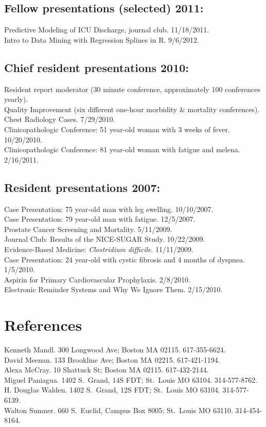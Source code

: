 \documentclass[12pt]{article}
\begin{document}
\subsection*{Fellow presentations (selected) 2011:}
Predictive Modeling of ICU Discharge, journal club. 11/18/2011.\\
Intro to Data Mining with Regression Splines in R. 9/6/2012.

\subsection*{Chief resident presentations 2010:}
Resident report moderator (30 minute conference, approximately 100
conferences yearly).\\
Quality Improvement (six different one-hour morbidity \& mortality
conferences).\\
Chest Radiology Cases. 7/29/2010.\\
Clinicopathologic Conference: 51 year-old woman with 3 weeks of fever.
10/20/2010.\\
Clinicopathologic Conference: 81 year-old woman with fatigue and
melena. 2/16/2011.

\subsection*{Resident presentations 2007:}
Case Presentation: 75 year-old man with leg swelling. 10/10/2007.\\
Case Presentation: 79 year-old man with fatigue. 12/5/2007.\\
Prostate Cancer Screening and Mortality. 5/11/2009.\\
Journal Club: Results of the NICE-SUGAR Study. 10/22/2009.\\
Evidence-Based Medicine: \emph{Clostridium difficile}. 11/11/2009.\\
Case Presentation: 24 year-old with cystic fibrosis and 4 months of
dyspnea. 1/5/2010.\\
Aspirin for Primary Cardiovascular Prophylaxis. 2/8/2010.\\
Electronic Reminder Systems and Why We Ignore Them. 2/15/2010.

\section*{References}
Kenneth Mandl. 300 Longwood Ave; Boston MA 02115. 617-355-6624.\\
David Meenan. 133 Brookline Ave; Boston MA 02215. 617-421-1194.\\
Alexa McCray. 10 Shattuck St; Boston MA 02115. 617-432-2144.\\
Miguel Paniagua. 1402 S.\ Grand, 14S FDT; St.\ Louis MO 63104.
314-577-8762.\\
H. Douglas Walden. 1402 S.\ Grand, 12S FDT; St.\ Louis MO 63104.
314-577-6139.\\
Walton Sumner. 660 S.\ Euclid, Campus Box 8005; St.\ Louis MO 63110.
314-454-8164.
\end{document}
